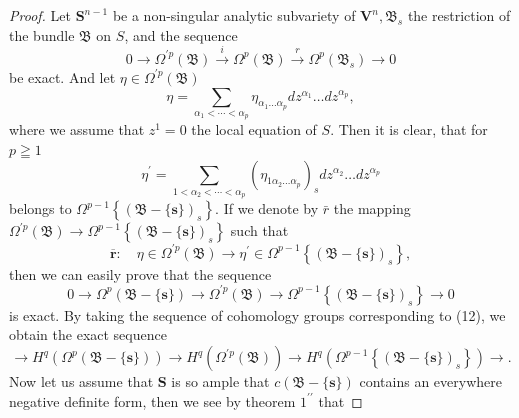 \documentclass[lang=en,12pt]{beautybook}
\begin{document}
\begin{proof}
  Let $\boldsymbol{S}^{n-1}$ be a non-singular analytic subvariety of $\boldsymbol{V}^n, \mathfrak{B}_s$ the restriction of the bundle $\mathfrak{B}$ on $S$, and the sequence
  \begin{equation*}
    0 \rightarrow \Omega^{\prime p}(\mathfrak{B}) \stackrel{i}{\rightarrow} \Omega^p(\mathfrak{B}) \stackrel{r}{\rightarrow} \Omega^p\left(\mathfrak{B}_s\right) \rightarrow 0
  \end{equation*}
  be exact. And let $\eta \in \Omega^{\prime p}(\mathfrak{B})$
  \begin{equation*}
    \eta=\sum_{\alpha_1<\cdots<\alpha_p} \eta_{\alpha_1 \ldots \alpha_p} d z^{\alpha_1} \ldots d z^{\alpha_p},
  \end{equation*}
  where we assume that $z^1=0$ the local equation of $S$. Then it is clear, that for $p \geqq 1$
  \begin{equation*}
    \eta^{\prime}=\sum_{1<\alpha_2<\cdots<\alpha_p}\left(\eta_{1 \alpha_2 \ldots \alpha_p}\right)_s d z^{\alpha_2} \ldots d z^{\alpha_p}
  \end{equation*}
  belongs to $\Omega^{p-1}\left\{(\mathfrak{B}-\{\boldsymbol{s}\})_s\right\}$. If we denote by $\bar{r}$ the mapping $\Omega^{\prime p}(\mathfrak{B})\rightarrow \Omega^{p-1}\left\{(\mathfrak{B}-\{\boldsymbol{s}\})_s\right\}$ such that
  \begin{equation*}
    \overline{\boldsymbol{r}}: \quad \eta \in \Omega^{\prime p}(\mathfrak{B}) \rightarrow \eta^{\prime} \in \Omega^{p-1}\left\{(\mathfrak{B}-\{\boldsymbol{s}\})_s\right\},
  \end{equation*}
  then we can easily prove that the sequence
  \begin{equation*}
    0 \rightarrow \Omega^p(\mathfrak{B}-\{\boldsymbol{s}\}) \rightarrow \Omega^{\prime p}(\mathfrak{B}) \rightarrow \Omega^{p-1}\left\{(\mathfrak{B}-\{\boldsymbol{s}\})_s\right\} \rightarrow 0
  \end{equation*}
  is exact. By taking the sequence of cohomology groups corresponding to (12), we obtain the exact sequence
  \begin{equation*}
    \rightarrow H^q\left(\Omega^p(\mathfrak{B}-\{\boldsymbol{s}\})\right) \rightarrow H^q\left(\Omega^{\prime p}(\mathfrak{B})\right) \rightarrow H^q\left(\Omega^{p-1}\left\{(\mathfrak{B}-\{\boldsymbol{s}\})_s\right\}\right) \rightarrow .
  \end{equation*}
  Now let us assume that $\boldsymbol{S}$ is so ample that $c(\mathfrak{B}-\{\boldsymbol{s}\})$ contains an everywhere negative definite form, then we see by theorem $1^{\prime \prime}$ that

\end{proof}
\end{document}
